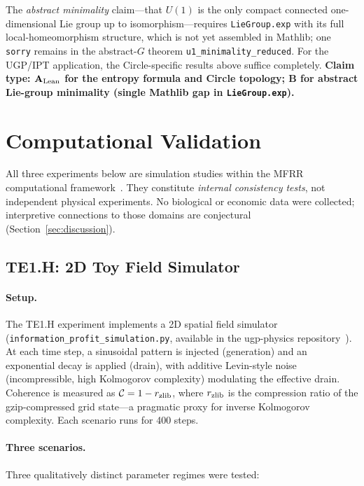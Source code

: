 \documentclass[11pt,twocolumn]{article}
\newcommand{\CatAL}{\ensuremath{\textbf{A}_{\rm Lean}}}
\newcommand{\CatB}{\textbf{B}}
\theoremstyle{remark}
\begin{document}
The \emph{abstract minimality} claim---that $U(1)$ is the only compact
connected one-dimensional Lie group up to isomorphism---requires
\texttt{LieGroup.exp} with its full local-homeomorphism structure, which is not
yet assembled in Mathlib; one \texttt{sorry} remains in the abstract-$G$ theorem
\texttt{u1\_minimality\_reduced}.  For the UGP/IPT application, the
Circle-specific results above suffice completely.  \textbf{Claim type: $\CatAL$ for
the entropy formula and Circle topology; $\CatB$ for abstract Lie-group minimality
(single Mathlib gap in \texttt{LieGroup.exp}).}

\section{Computational Validation}
\label{sec:validation}

All three experiments below are simulation studies within the MFRR
computational framework~\cite{ugp-physics-repo}. They constitute
\emph{internal consistency tests}, not independent physical experiments.
No biological or economic data were collected; interpretive connections
to those domains are conjectural (Section~\ref{sec:discussion}).

\subsection{TE1.H: 2D Toy Field Simulator}
\label{sec:validation:te1h}

\paragraph{Setup.}
The TE1.H experiment implements a 2D spatial field simulator
(\texttt{information\_profit\_simulation.py}, available in the
ugp-physics repository~\cite{ugp-physics-repo}). At each time step,
a sinusoidal pattern is injected (generation) and an exponential
decay is applied (drain), with additive Levin-style noise
(incompressible, high Kolmogorov complexity) modulating the effective
drain. Coherence is measured as $\mathcal{C} = 1 - r_{\rm zlib}$,
where $r_{\rm zlib}$ is the compression ratio of the gzip-compressed
grid state---a pragmatic proxy for inverse Kolmogorov complexity.
Each scenario runs for 400 steps.

\paragraph{Three scenarios.}
Three qualitatively distinct parameter regimes were tested:
\end{document}
